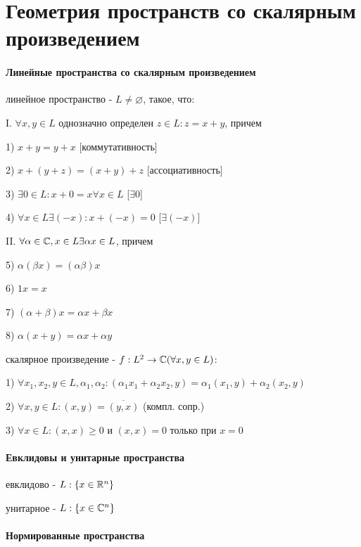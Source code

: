 \documentclass[russian,twocolumn]{article}
\begin{document}
\section{Геометрия пространств со скалярным произведением}

\paragraph{Линейные пространства со скалярным произведением}

линейное пространство - $L \ne \varnothing$, такое, что:

I. $\forall x,y \in L$ однозначно определен $z \in L : z = x + y$, причем

1) $x + y = y + x$ [коммутативность]

2) $x + (y + z) = (x + y) + z$ [ассоциативность]

3) $\exists 0 \in L : x + 0 = x \forall x \in L$ [$\exists 0$]
 
4) $\forall x \in L \exists (-x) : x + (-x) = 0$ [$\exists (-x)$]

II. $\forall \alpha \in \Bbb C, x \in L \exists \alpha x \in L$, причем

5) $\alpha (\beta x) = (\alpha \beta) x$

6) $1 x = x$

7) $(\alpha + \beta) x = \alpha x + \beta x$

8) $\alpha (x + y) = \alpha x + \alpha y$

скалярное произведение - $f: L^2 \to \Bbb C (\forall x,y \in L)$:

1) $\forall x_{1},x_{2},y\in L,\alpha_{1},\alpha_{2}:(\alpha_{1}x_{1}+\alpha_{2}x_{2},y)=\alpha_{1}(x_{1},y)+\alpha_{2}(x_{2},y)$

2) $\forall x,y\in L:(x,y)=\overline{(y,x)}$ (компл. сопр.)

3) $\forall x\in L:(x,x)\ge0$ и $(x,x)=0$ только при $x=0$

\paragraph{Евклидовы и унитарные пространства}

евклидово - $L:\{x \in \Bbb R^n \}$ 

унитарное - $L:\{x \in \Bbb C^n \}$

\paragraph{Нормированные пространства}
\end{document}
